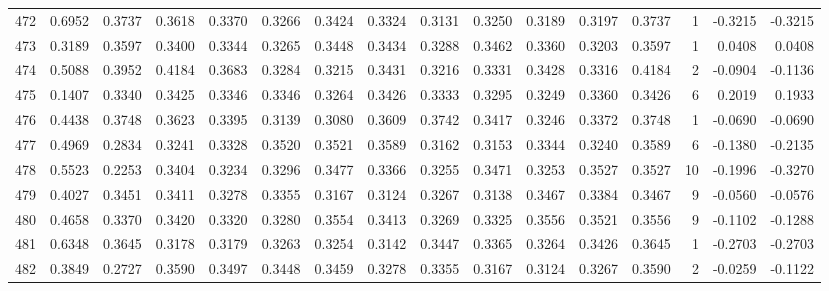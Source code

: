 \begin{tabular}{lrrrrrrrrrrrrrrr}
472 &      0.6952 &  0.3737 &  0.3618 &  0.3370 &  0.3266 &  0.3424 &  0.3324 &  0.3131 &  0.3250 &  0.3189 &   0.3197 &     0.3737 &      1 &                   -0.3215 &                    -0.3215 \\
473 &      0.3189 &  0.3597 &  0.3400 &  0.3344 &  0.3265 &  0.3448 &  0.3434 &  0.3288 &  0.3462 &  0.3360 &   0.3203 &     0.3597 &      1 &                    0.0408 &                     0.0408 \\
474 &      0.5088 &  0.3952 &  0.4184 &  0.3683 &  0.3284 &  0.3215 &  0.3431 &  0.3216 &  0.3331 &  0.3428 &   0.3316 &     0.4184 &      2 &                   -0.0904 &                    -0.1136 \\
475 &      0.1407 &  0.3340 &  0.3425 &  0.3346 &  0.3346 &  0.3264 &  0.3426 &  0.3333 &  0.3295 &  0.3249 &   0.3360 &     0.3426 &      6 &                    0.2019 &                     0.1933 \\
476 &      0.4438 &  0.3748 &  0.3623 &  0.3395 &  0.3139 &  0.3080 &  0.3609 &  0.3742 &  0.3417 &  0.3246 &   0.3372 &     0.3748 &      1 &                   -0.0690 &                    -0.0690 \\
477 &      0.4969 &  0.2834 &  0.3241 &  0.3328 &  0.3520 &  0.3521 &  0.3589 &  0.3162 &  0.3153 &  0.3344 &   0.3240 &     0.3589 &      6 &                   -0.1380 &                    -0.2135 \\
478 &      0.5523 &  0.2253 &  0.3404 &  0.3234 &  0.3296 &  0.3477 &  0.3366 &  0.3255 &  0.3471 &  0.3253 &   0.3527 &     0.3527 &     10 &                   -0.1996 &                    -0.3270 \\
479 &      0.4027 &  0.3451 &  0.3411 &  0.3278 &  0.3355 &  0.3167 &  0.3124 &  0.3267 &  0.3138 &  0.3467 &   0.3384 &     0.3467 &      9 &                   -0.0560 &                    -0.0576 \\
480 &      0.4658 &  0.3370 &  0.3420 &  0.3320 &  0.3280 &  0.3554 &  0.3413 &  0.3269 &  0.3325 &  0.3556 &   0.3521 &     0.3556 &      9 &                   -0.1102 &                    -0.1288 \\
481 &      0.6348 &  0.3645 &  0.3178 &  0.3179 &  0.3263 &  0.3254 &  0.3142 &  0.3447 &  0.3365 &  0.3264 &   0.3426 &     0.3645 &      1 &                   -0.2703 &                    -0.2703 \\
482 &      0.3849 &  0.2727 &  0.3590 &  0.3497 &  0.3448 &  0.3459 &  0.3278 &  0.3355 &  0.3167 &  0.3124 &   0.3267 &     0.3590 &      2 &                   -0.0259 &                    -0.1122 \\

\end{tabular}
